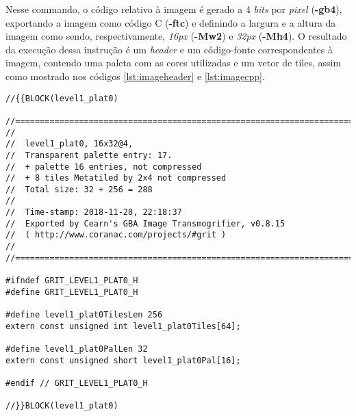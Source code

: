 Nesse commando, o código relativo à imagem é gerado a 4 \textit{bits} por \textit{pixel} (\textbf{-gb4}), exportando a imagem como código C (\textbf{-ftc}) e definindo a largura e a altura da imagem como sendo, respectivamente, \textit{16px} (\textbf{-Mw2}) e \textit{32px} (\textbf{-Mh4}). O resultado da execução dessa instrução é um \textit{header} e um código-fonte correspondentes à imagem, contendo uma paleta com as cores utilizadas e um vetor de tiles, assim como mostrado nos códigos \ref{lst:imageheader} e \ref{lst:imagecpp}.


\begin{lstlisting}[caption={\textit{Header} da parte superior da imagem da plataforma da primeira fase.},label={lst:imageheader}]
//{{BLOCK(level1_plat0)

//======================================================================
//
//  level1_plat0, 16x32@4,
//  Transparent palette entry: 17.
//  + palette 16 entries, not compressed
//  + 8 tiles Metatiled by 2x4 not compressed
//  Total size: 32 + 256 = 288
//
//  Time-stamp: 2018-11-28, 22:18:37
//  Exported by Cearn's GBA Image Transmogrifier, v0.8.15
//  ( http://www.coranac.com/projects/#grit )
//
//======================================================================

#ifndef GRIT_LEVEL1_PLAT0_H
#define GRIT_LEVEL1_PLAT0_H

#define level1_plat0TilesLen 256
extern const unsigned int level1_plat0Tiles[64];

#define level1_plat0PalLen 32
extern const unsigned short level1_plat0Pal[16];

#endif // GRIT_LEVEL1_PLAT0_H

//}}BLOCK(level1_plat0)
\end{lstlisting}

